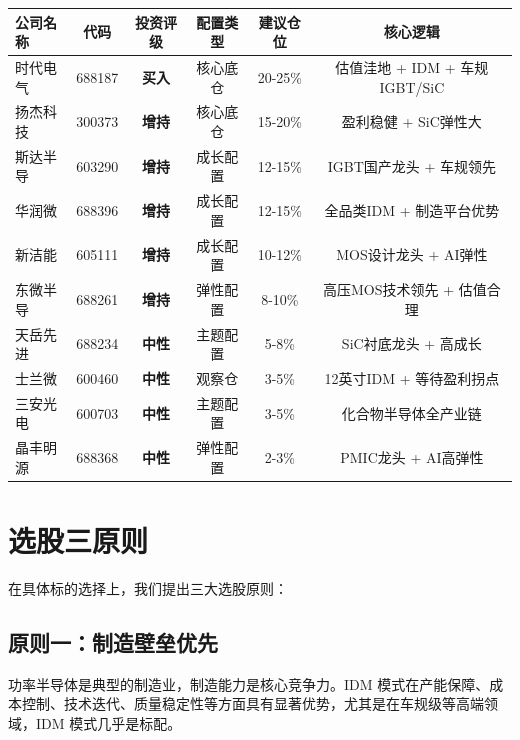 \begin{exhibitbox}[表 11-2：推荐投资组合]
\centering
\small
\begin{tabularx}{\textwidth}{X c c c c c}
\toprule
\textbf{公司名称} & \textbf{代码} & \textbf{投资评级} & \textbf{配置类型} & \textbf{建议仓位} & \textbf{核心逻辑} \\
\midrule
\rowcolor{riskgreen!5}
时代电气 & 688187 & \textbf{买入} & 核心底仓 & 20-25\% & 估值洼地 + IDM + 车规IGBT/SiC \\
\rowcolor{riskgreen!5}
扬杰科技 & 300373 & \textbf{增持} & 核心底仓 & 15-20\% & 盈利稳健 + SiC弹性大 \\
\rowcolor{accentblue!5}
斯达半导 & 603290 & \textbf{增持} & 成长配置 & 12-15\% & IGBT国产龙头 + 车规领先 \\
\rowcolor{accentblue!5}
华润微 & 688396 & \textbf{增持} & 成长配置 & 12-15\% & 全品类IDM + 制造平台优势 \\
\rowcolor{accentblue!5}
新洁能 & 605111 & \textbf{增持} & 成长配置 & 10-12\% & MOS设计龙头 + AI弹性 \\
\rowcolor{riskamber!5}
东微半导 & 688261 & \textbf{增持} & 弹性配置 & 8-10\% & 高压MOS技术领先 + 估值合理 \\
\rowcolor{riskamber!5}
天岳先进 & 688234 & \textbf{中性} & 主题配置 & 5-8\% & SiC衬底龙头 + 高成长 \\
\rowcolor{steelgrey!10}
士兰微 & 600460 & \textbf{中性} & 观察仓 & 3-5\% & 12英寸IDM + 等待盈利拐点 \\
\rowcolor{steelgrey!10}
三安光电 & 600703 & \textbf{中性} & 主题配置 & 3-5\% & 化合物半导体全产业链 \\
\rowcolor{steelgrey!10}
晶丰明源 & 688368 & \textbf{中性} & 弹性配置 & 2-3\% & PMIC龙头 + AI高弹性 \\
\bottomrule
\end{tabularx}
\end{exhibitbox}

\section{选股三原则}

在具体标的选择上，我们提出三大选股原则：

\subsection{原则一：制造壁垒优先}

功率半导体是典型的制造业，制造能力是核心竞争力。IDM 模式在产能保障、成本控制、技术迭代、质量稳定性等方面具有显著优势，尤其是在车规级等高端领域，IDM 模式几乎是标配。

